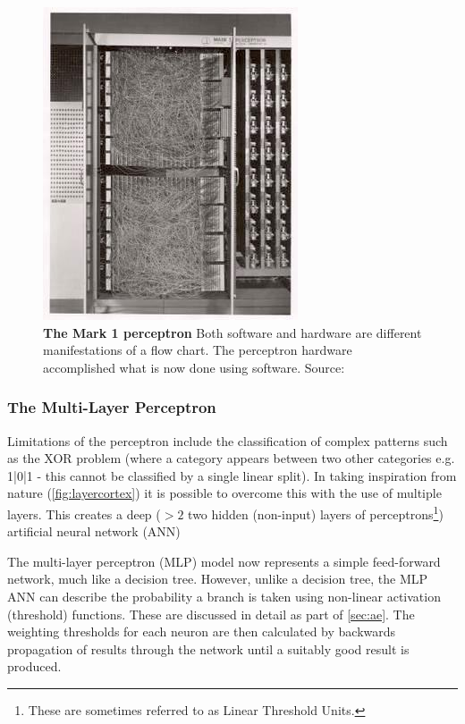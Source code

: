 \begin{figure}[H]
     \centering
         \includegraphics[width=.45\textwidth]{figures_c3/mlpregressor/Mark_I_perceptron.jpg}
        \caption{\textbf{The Mark 1 perceptron} Both software and hardware are different manifestations of a flow chart. The perceptron hardware accomplished what is now done using software. Source: \cite{perceptronimage}}
        \label{fig:perceptron}
\end{figure}

\subsubsection{The Multi-Layer Perceptron}\label{sec:perceptron}
Limitations of the perceptron include the classification of complex patterns such as the XOR problem (where a category appears between two other categories e.g. {1|0|1} - this cannot be classified by a single linear split). In taking inspiration from nature (\autoref{fig:layercortex}) it is possible to overcome this with the use of multiple layers. This creates a deep ($>2$ two hidden (non-input) layers of perceptrons\footnote{These are sometimes referred to as Linear Threshold Units.}) artificial neural network (ANN) 

The multi-layer perceptron (MLP) model now represents a simple feed-forward network, much like a decision tree. However, unlike a decision tree, the MLP ANN can describe the probability a branch is taken using non-linear activation (threshold) functions. These are discussed in detail as part of \autoref{sec:ae}. The weighting thresholds for each neuron are then calculated by backwards propagation of results through the network until a suitably good result is produced. 

